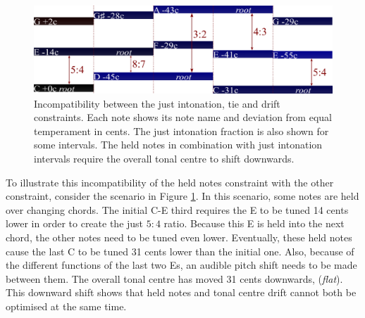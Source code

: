 \documentclass[a4paper]{article}
\begin{document}

\begin{figure}
	\centering
	\includegraphics[width=\textwidth]{Figures/ties_vs_ji.pdf}
	\caption{Incompatibility between the just intonation, tie and drift constraints. Each note shows its note name and deviation from equal temperament in cents. The just intonation fraction is also shown for some intervals. The held notes in combination with just intonation intervals require the overall tonal centre to shift downwards.}
	\label{fig:ties_vs_ji}
\end{figure}

To illustrate this incompatibility of the held notes constraint with the other constraint, consider the scenario in Figure \ref{fig:ties_vs_ji}. In this scenario, some notes are held over changing chords. The initial C-E third requires the E to be tuned 14 cents lower in order to create the just $5:4$ ratio. Because this E is held into the next chord, the other notes need to be tuned even lower. Eventually, these held notes cause the last C to be tuned 31 cents lower than the initial one. Also, because of the different functions of the last two Es, an audible pitch shift needs to be made between them. The overall tonal centre has moved 31 cents downwards, (\textit{flat}). This downward shift shows that held notes and tonal centre drift cannot both be optimised at the same time.
\end{document}
